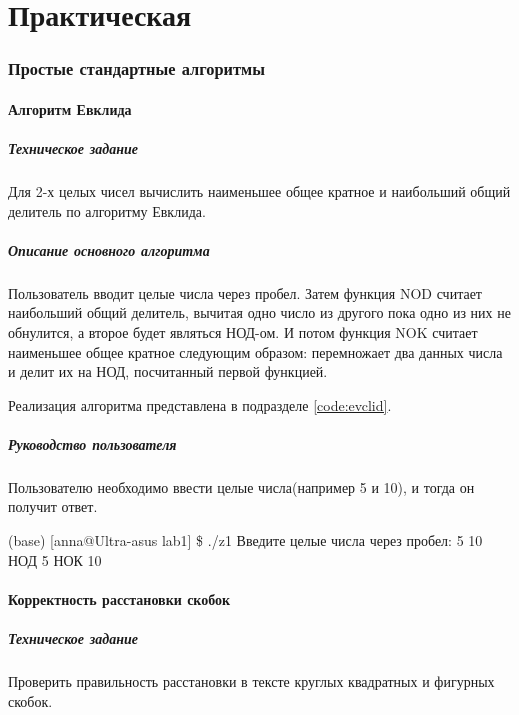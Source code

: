 \documentclass[a4paper,12pt]{extarticle}
\begin{document}
\part{Практическая}
\section{Простые стандартные алгоритмы}
\subsection{Алгоритм Евклида} 
\subsubsection{Техническое задание}
Для 2-х целых чисел вычислить наименьшее общее кратное и наибольший общий делитель по алгоритму Евклида.

\subsubsection{Описание основного алгоритма}
Пользователь вводит целые числа через пробел. Затем функция NOD считает наибольший общий делитель, вычитая одно число из другого пока одно из них не обнулится, а второе будет являться НОД-ом. И потом функция NOK считает наименьшее общее кратное следующим образом: перемножает два данных числа и делит их на НОД, посчитанный первой функцией.

Реализация алгоритма представлена в подразделе \ref{code:evclid}.

\subsubsection{Руководство пользователя}
Пользователю необходимо ввести целые числа(например 5 и 10), и тогда он получит ответ.

(base) [anna@Ultra-asus lab1] \$ ./z1 \newline
Введите целые числа через пробел: 5 10\newline
НОД 5 НОК 10

\subsection{Корректность расстановки скобок}
\subsubsection{Техническое задание}
Проверить  правильность  расстановки  в  тексте  круглых  квадратных и  фигурных скобок.
\end{document}
